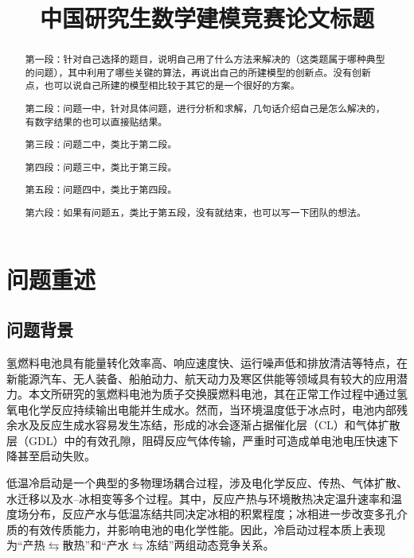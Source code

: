 \documentclass[bwprint]{gmcmthesis}
\title{中国研究生数学建模竞赛论文标题}
\numberwithin{figure}{section}
\begin{document}
 \maketitle
 \begin{abstract}
第一段：针对自己选择的题目，说明自己用了什么方法来解决的（这类题属于哪种典型的问题），其中利用了哪些关键的算法，再说出自己的所建模型的创新点。没有创新点，也可以说自己所建的模型相比较于其它的是一个很好的方案。

第二段：问题一中，针对具体问题，进行分析和求解，几句话介绍自己是怎么解决的，有数字结果的也可以直接贴结果。

第三段：问题二中，类比于第二段。

第四段：问题三中，类比于第三段。

第五段：问题四中，类比于第四段。

第六段：如果有问题五，类比于第五段，没有就结束，也可以写一下团队的想法。






\end{abstract}


\tableofcontents

\clearpage

\section{问题重述}
\subsection{问题背景}
氢燃料电池具有能量转化效率高、响应速度快、运行噪声低和排放清洁等特点，在新能源汽车、无人装备、船舶动力、航天动力及寒区供能等领域具有较大的应用潜力。本文所研究的氢燃料电池为质子交换膜燃料电池，其在正常工作过程中通过氢氧电化学反应持续输出电能并生成水。然而，当环境温度低于冰点时，电池内部残余水及反应生成水容易发生冻结，形成的冰会逐渐占据催化层（CL）和气体扩散层（GDL）中的有效孔隙，阻碍反应气体传输，严重时可造成单电池电压快速下降甚至启动失败。

低温冷启动是一个典型的多物理场耦合过程，涉及电化学反应、传热、气体扩散、水迁移以及水–冰相变等多个过程。其中，反应产热与环境散热决定温升速率和温度场分布，反应产水与低温冻结共同决定冰相的积累程度；冰相进一步改变多孔介质的有效传质能力，并影响电池的电化学性能。因此，冷启动过程本质上表现为“产热$\leftrightarrows$散热”和“产水$\leftrightarrows$冻结”两组动态竞争关系。
\end{document}
